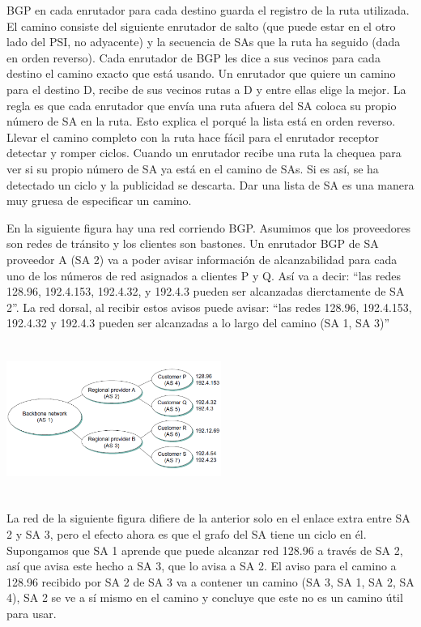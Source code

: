 \documentclass[10pt,a4paper]{report}
\begin{document}
	\par BGP en cada enrutador para cada destino guarda el registro de la ruta utilizada. El camino consiste del siguiente enrutador de salto (que puede estar en el otro lado del PSI, no adyacente) y la secuencia de SAs que la ruta ha seguido (dada en orden reverso). Cada enrutador de BGP les dice a sus vecinos para cada destino el camino exacto que está usando. Un enrutador que quiere un camino para el destino D, recibe de sus vecinos rutas a D y entre ellas elige la mejor. La regla es que cada enrutador que envía una ruta afuera del SA coloca su propio número de SA en la ruta. Esto explica el porqué la lista está en orden reverso. Llevar el camino completo con la ruta hace fácil para el enrutador receptor detectar y romper ciclos. Cuando un enrutador recibe una ruta la chequea para ver si su propio número de SA ya está en el camino de SAs. Si es así, se ha detectado un ciclo y la publicidad se descarta. Dar una lista de SA es una manera muy gruesa de especificar un camino.

	\par En la siguiente figura hay una red corriendo BGP. Asumimos que los proveedores son redes de tránsito y los clientes son bastones. Un enrutador BGP de SA proveedor A (SA 2) va a poder avisar información de alcanzabilidad para cada uno de los números de red asignados a clientes P y Q.  Así va a decir: “las redes 128.96, 192.4.153, 192.4.32, y 192.4.3 pueden ser alcanzadas dierctamente de SA 2”. La red dorsal, al recibir estos avisos puede avisar: “las redes 128.96, 192.4.153, 192.4.32 y 192.4.3 pueden ser alcanzadas a lo largo del camino (SA 1, SA 3)”

	\begin{center}
		\includegraphics[width=7cm, height=5cm]{./imagenes/fig1.png}
	\end{center}
	
	\par La red de la siguiente figura difiere de la anterior solo en el enlace extra entre SA 2 y SA 3, pero el efecto ahora es que el grafo del SA tiene un ciclo en él. Supongamos que SA 1 aprende que puede alcanzar red 128.96 a través de SA 2, así que avisa este hecho a SA 3, que lo avisa a SA 2. El aviso para el camino a 128.96 recibido por SA 2 de SA 3 va a contener un camino (SA 3, SA 1, SA 2, SA 4), SA 2 se ve a sí mismo en el camino y concluye que este no es un camino útil para usar.
\end{document}
